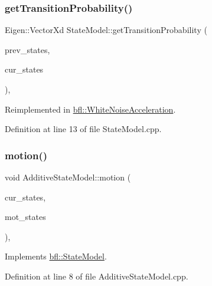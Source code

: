 \subsubsection{\texorpdfstring{get\+Transition\+Probability()}{getTransitionProbability()}}
{\footnotesize\ttfamily Eigen\+::\+Vector\+Xd State\+Model\+::get\+Transition\+Probability (\begin{DoxyParamCaption}\item[{const Eigen\+::\+Ref$<$ const Eigen\+::\+Matrix\+Xd $>$ \&}]{prev\+\_\+states,  }\item[{Eigen\+::\+Ref$<$ Eigen\+::\+Matrix\+Xd $>$}]{cur\+\_\+states }\end{DoxyParamCaption})\hspace{0.3cm}{\ttfamily [virtual]}, {\ttfamily [inherited]}}



Reimplemented in \mbox{\hyperlink{classbfl_1_1WhiteNoiseAcceleration_a10d81273e59d14f7d7ce794533c122a8}{bfl\+::\+White\+Noise\+Acceleration}}.



Definition at line 13 of file State\+Model.\+cpp.

\mbox{\label{classbfl_1_1AdditiveStateModel_a9f145bf8c592fc0092d84421f26dbb8b}} 
\subsubsection{\texorpdfstring{motion()}{motion()}}
{\footnotesize\ttfamily void Additive\+State\+Model\+::motion (\begin{DoxyParamCaption}\item[{const Eigen\+::\+Ref$<$ const Eigen\+::\+Matrix\+Xd $>$ \&}]{cur\+\_\+states,  }\item[{Eigen\+::\+Ref$<$ Eigen\+::\+Matrix\+Xd $>$}]{mot\+\_\+states }\end{DoxyParamCaption})\hspace{0.3cm}{\ttfamily [override]}, {\ttfamily [virtual]}}



Implements \mbox{\hyperlink{classbfl_1_1StateModel_a34037bc30bc07667b76b5a719a65ab82}{bfl\+::\+State\+Model}}.



Definition at line 8 of file Additive\+State\+Model.\+cpp.

